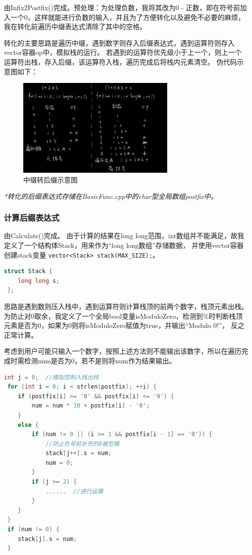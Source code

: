 \documentclass[a4paper, 11pt, UTF8]{ctexart}
\begin{document}
由Infix2Postfix()完成。预处理：为处理负数，我将其改为0 - 正数，即在符号前加入一个0，这样就能进行负数的输入，并且为了方便转化以及避免不必要的麻烦，
我在转化前遍历中缀表达式清除了其中的空格。

转化的主要思路是遍历中缀，遇到数字则存入后缀表达式，遇到运算符则存入vector容器op中，模拟栈的运行。
若遇到的运算符优先级小于上一个，则上一个运算符出栈，存入后缀，该运算符入栈，遍历完成后将栈内元素清空。
伪代码示意图如下：

\begin{figure}[H]
    \centering
    \includegraphics[width=0.7\textwidth]{infix2postfix.jpg}
    \caption{中缀转后缀示意图}
\end{figure}

\textit{*转化的后缀表达式存储在BasicFunc.cpp中的char型全局数组postfix中。}

\subsubsection{计算后缀表达式}

由Calculate()完成。
由于计算的结果在long long范围，int数组并不能满足，故我定义了一个结构体Stack，用来作为“long long数组”存储数据，
并使用vector容器创建stack变量 \verb|vector<Stack> stack(MAX_SIZE);|。

\begin{lstlisting}[language=C++, basicstyle=\ttfamily]
 struct Stack { 
	long long s;
 };
\end{lstlisting}

思路是遇到数则压入栈中，遇到运算符则计算栈顶的前两个数字，栈顶元素出栈。
为防止对0取余，我定义了一个全局bool变量isModuloZero，检测到\%时判断栈顶元素是否为0，如果为0则将isModuloZero赋值为true，并输出“Modulo 0!”，
反之正常计算。

考虑到用户可能只输入一个数字，按照上述方法则不能输出该数字，所以在遍历完成时需检测num是否为0，若不是则将num作为结果输出。

\begin{lstlisting}[language=C++, basicstyle=\ttfamily]
 int j = 0;  //模拟控制入栈出栈
 for (int i = 0; i < strlen(postfix); ++i) {
    if (postfix[i] >= '0' && postfix[i] <= '9') {
        num = num * 10 + postfix[i] - '0';
    }
    else {
        if (num != 0 || (i >= 1 && postfix[i - 1] == '0')) {
            //防止负号前补充的0被忽略
            stack[j++].s = num;
            num = 0;
        }
        if (j >= 2) {
            ......  //进行运算
        }
    }
 }
 if (num != 0) {
    stack[j].s = num;
 }
\end{lstlisting}
\end{document}
